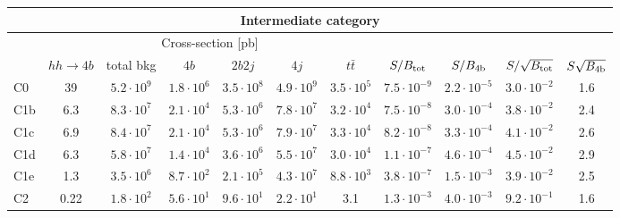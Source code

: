 \begin{tabular}{|l|cc|cccc|cccc|}
  \hline
\multicolumn{11}{|c|}{Intermediate category}\\
\hline
&  \multicolumn{6}{c|}{Cross-section [pb]} &  &  & &  \\
   &  $hh\to 4b$ &  total bkg  &   $4b$    &  $2b2j$   &   $4j$    &
$t\bar{t}$ &
$S/B_{\rm tot}$ & $S/B_{\rm 4b}$ & $S/\sqrt{B_{\rm tot}}$ & $S\sqrt{B_{\rm 4b}}$ \\
  \hline
  \hline
 C0      & 39  &   $5.2\cdot 10^9$   & $1.8\cdot 10^6$ & $3.5\cdot 10^8$ & $4.9\cdot 10^9$ & $3.5\cdot 10^5$ &  $7.5\cdot 10^{-9}$   & $2.2\cdot 10^{-5}$   &   $3.0\cdot 10^{-2}$   & 1.6  \\
  C1b     & 6.3  &  $ 8.3\cdot 10^7$   & $2.1\cdot 10^4$ & $5.3\cdot 10^6$ & $7.8\cdot 10^7$ & $3.2\cdot 10^4$ & $7.5\cdot 10^{-8}$   & $3.0\cdot 10^{-4}$  &   $3.8\cdot 10^{-2}$   & 2.4 \\
 C1c     & 6.9  &   $8.4\cdot 10^7$   & $2.1\cdot 10^4$ & $5.3\cdot 10^6$ & $7.9\cdot 10^7$ & $3.3\cdot 10^4$ &  $8.2\cdot 10^{-8}$   & $3.3\cdot 10^{-4}$ &   $4.1\cdot 10^{-2}$   & 2.6 \\
 C1d     & 6.3  &   $5.8\cdot 10^7$   & $1.4\cdot 10^4$ & $3.6\cdot 10^6$ & $5.5\cdot 10^7$ & $3.0\cdot 10^4$ &  $1.1\cdot 10^{-7}$   & $4.6\cdot 10^{-4}$ &   $4.5\cdot 10^{-2}$   & 2.9\\
 C1e     & 1.3  &   $3.5\cdot 10^6$   & $8.7\cdot 10^2$ & $2.1\cdot 10^5$ & $4.3\cdot 10^7$ & $8.8\cdot 10^3$ &  $3.8\cdot 10^{-7}$   & $1.5\cdot 10^{-3}$  &   $3.9\cdot 10^{-2}$   & 2.5\\
 C2      & 0.22  &   $1.8\cdot 10^2$   & $5.6\cdot 10^1$ & $9.6\cdot 10^1$ & $2.2\cdot 10^1$ & 3.1 & $1.3\cdot 10^{-3}$   & $4.0\cdot 10^{-3}$  &   $9.2\cdot 10^{-1}$   & 1.6 \\
\hline
\end{tabular}
